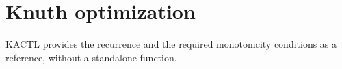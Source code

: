 \section{Knuth optimization}
KACTL provides the recurrence and the required monotonicity conditions as a reference, without a standalone function.

